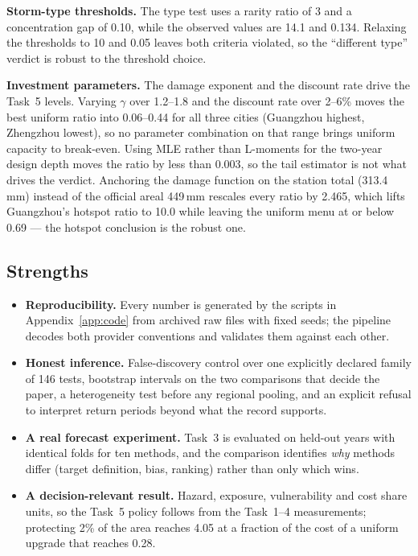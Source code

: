 \textbf{Storm-type thresholds.} The type test uses a rarity ratio of 3 and a concentration gap of 0.10, while the observed values are 14.1 and 0.134. Relaxing the thresholds to 10 and 0.05 leaves both criteria violated, so the ``different type'' verdict is robust to the threshold choice.

\textbf{Investment parameters.} The damage exponent and the discount rate drive the Task~5 levels. Varying $\gamma$ over 1.2--1.8 and the discount rate over 2--6\% moves the best uniform ratio into 0.06--0.44 for all three cities (Guangzhou highest, Zhengzhou lowest), so no parameter combination on that range brings uniform capacity to break-even. Using MLE rather than L-moments for the two-year design depth moves the ratio by less than 0.003, so the tail estimator is not what drives the verdict. Anchoring the damage function on the station total (313.4\,mm) instead of the official areal 449\,mm rescales every ratio by 2.465, which lifts Guangzhou's hotspot ratio to 10.0 while leaving the uniform menu at or below 0.69 --- the hotspot conclusion is the robust one.

\subsection{Strengths}

{\small
\begin{itemize}[leftmargin=1.4em,itemsep=1pt,topsep=2pt]
\item \textbf{Reproducibility.} Every number is generated by the scripts in Appendix~\ref{app:code} from archived raw files with fixed seeds; the pipeline decodes both provider conventions and validates them against each other.
\item \textbf{Honest inference.} False-discovery control over one explicitly declared family of 146 tests, bootstrap intervals on the two comparisons that decide the paper, a heterogeneity test before any regional pooling, and an explicit refusal to interpret return periods beyond what the record supports.
\item \textbf{A real forecast experiment.} Task~3 is evaluated on held-out years with identical folds for ten methods, and the comparison identifies \emph{why} methods differ (target definition, bias, ranking) rather than only which wins.
\item \textbf{A decision-relevant result.} Hazard, exposure, vulnerability and cost share units, so the Task~5 policy follows from the Task~1--4 measurements; protecting 2\% of the area reaches 4.05 at a fraction of the cost of a uniform upgrade that reaches 0.28.
\end{itemize}}

